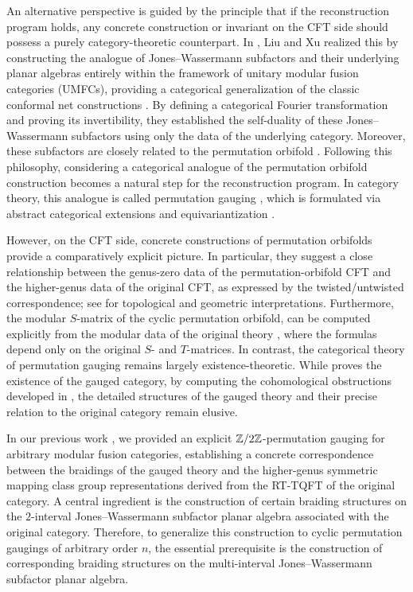 \documentclass{amsart}
\begin{document}
An alternative perspective is guided by the principle that if the reconstruction program holds, any concrete construction or invariant on the CFT side should possess a purely category-theoretic counterpart. In \cite{LX19}, Liu and Xu realized this by constructing the analogue of Jones–Wassermann subfactors and their underlying planar algebras entirely within the framework of unitary modular fusion categories (UMFCs), providing a categorical generalization of the classic conformal net constructions \cite{LR95, Was98, Xu00, KLM01, KLX05}. By defining a categorical Fourier transformation and proving its invertibility, they established the self-duality of these Jones–Wassermann subfactors using only the data of the underlying category. Moreover, these subfactors are closely related to the permutation orbifold \cite{KLX05}. Following this philosophy, considering a categorical analogue of the permutation orbifold construction becomes a natural step for the reconstruction program. In category theory, this analogue is called permutation gauging \cite{Muger05, CGPW16}, which is formulated via abstract categorical extensions and equivariantization \cite{ENO05, ENO10}. 

However, on the CFT side, concrete constructions of permutation orbifolds \cite{Bantay98, BHS98, Bantay02, KLM01, LX04, KLX05} provide a comparatively explicit picture.  In particular, they suggest a close relationship between the genus-zero data of the permutation-orbifold CFT and the higher-genus data of the original CFT, as expressed by the twisted/untwisted correspondence; see \cite{BS11, Gui21} for topological and geometric interpretations.  Furthermore, the modular $S$-matrix of the cyclic permutation orbifold, can be computed explicitly from the modular data of the original theory \cite{Bantay98, KLX05, BHS98, DRX21, DXY22}, where the formulas depend only on the original $S$- and $T$-matrices.  In contrast, the categorical theory of permutation gauging remains largely existence-theoretic. While \cite{GJ19} proves the existence of the gauged category, by computing the cohomological obstructions developed in \cite{ENO10}, the detailed structures of the gauged theory and their precise relation to the original category remain elusive.


In our previous work \cite{LR24}, we provided an explicit $\mathbb{Z}/{2}\mathbb{Z}$-permutation gauging for arbitrary modular fusion categories, establishing a concrete correspondence between the braidings of the gauged theory and the higher-genus symmetric mapping class group representations derived from the RT-TQFT of the original category. A central ingredient is the construction of certain braiding structures on the $2$-interval Jones–Wassermann subfactor planar algebra associated with the original category. Therefore, to generalize this construction to cyclic permutation gaugings of arbitrary order $n$, the essential prerequisite is the construction of corresponding braiding structures on the multi-interval Jones–Wassermann subfactor planar algebra.
\end{document}
